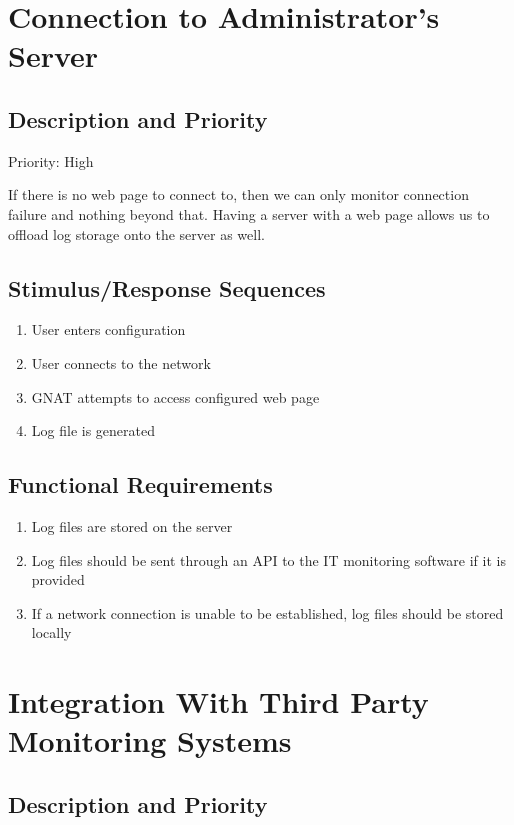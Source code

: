 \documentclass{scrreprt}
\begin{document}
\section{Connection to Administrator's Server}

\subsection{Description and Priority}

Priority: High

If there is no web page to connect to, then we can only monitor connection failure and nothing beyond that. Having a server with a web page allows us to offload log storage onto the server as well.

\subsection{Stimulus/Response Sequences}

\begin{enumerate}
  \item User enters configuration
  \item User connects to the network
  \item GNAT attempts to access configured web page
  \item Log file is generated
\end{enumerate}

\subsection{Functional Requirements}

\begin{enumerate}
  \item Log files are stored on the server
  \item Log files should be sent through an API to the IT monitoring software if it is provided
  \item If a network connection is unable to be established, log files should be stored locally
\end{enumerate}

\section{Integration With Third Party Monitoring Systems}

\subsection{Description and Priority}
\end{document}
